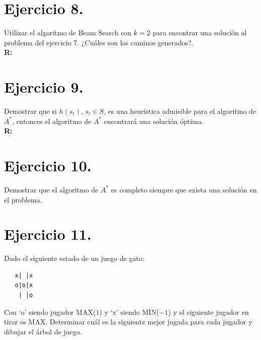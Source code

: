 \documentclass[12pt,letterpaper]{article}
\begin{document}
\bigskip


\newpage


\section{Ejercicio 8.}
Utilizar el algoritmo de Beam Search con $k=2$ para encontrar una solución al problema del ejercicio 7. ¿Cuáles son los caminos generados?.\\
\textbf{R: } 
\bigskip


\newpage


\section{Ejercicio 9.}
Demostrar que si $h(s_t),\, s_t \in S$, es una heurística admisible para el algoritmo de $A^*$, entonces el algoritmo de $A^*$ encontrará una solución óptima.\\
\textbf{R: } 

\bigskip


\newpage


\section{Ejercicio 10.}
Demostrar que el algoritmo de $A^*$ es completo siempre que exista una solución en el problema.

\bigskip



\newpage


\section{Ejercicio 11.}
Dado el siguiente estado de un juego de gato:
\begin{center}
\begin{verbatim}
   x| |x 
   o|o|x
    | |o
\end{verbatim}
\end{center}

Con ‘o’ siendo jugador MAX($1$) y ‘x’ siendo MIN($-1$) y el siguiente jugador en tirar es MAX. Determinar cuál es la siguiente mejor jugada para cada jugador y dibujar el árbol de juego.
\end{document}
